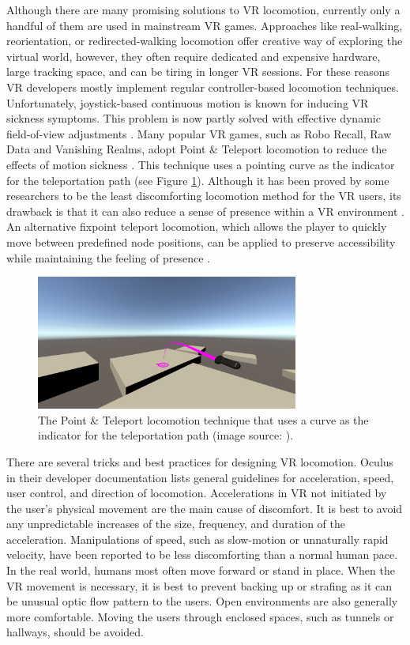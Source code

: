 Although there are many promising solutions to VR locomotion, currently only a handful of them are used in mainstream VR games. Approaches like real-walking, reorientation, or redirected-walking locomotion offer creative way of exploring the virtual world, however, they often require dedicated and expensive hardware, large tracking space, and can be tiring in longer VR sessions. For these reasons VR developers mostly implement regular controller-based locomotion techniques. Unfortunately, joystick-based continuous motion is known for inducing VR sickness symptoms. This problem is now partly solved with effective dynamic field-of-view adjustments \cite{DYNAMICFOD}. Many popular VR games, such as Robo Recall, Raw Data and Vanishing Realms, adopt Point \& Teleport locomotion to reduce the effects of motion sickness \cite{TELEPORTATIONGAMES}. This technique uses a pointing curve as the indicator for the teleportation path (see Figure \ref{fig:TELEPORTATIONCURVEIMAGE}). Although it has been proved by some researchers to be the least discomforting locomotion method for the VR users, its drawback is that it can also reduce a sense of presence within a VR environment \cite{TELEPORTATIONEFFECTS}. An alternative fixpoint teleport locomotion, which allows the player to quickly move between predefined node positions, can be applied to preserve accessibility while maintaining the feeling of presence \cite{NODEBASEDTELEPORTATION}.

\begin{figure}[th]
\centering
\includegraphics[width=0.77\textwidth]{img/teleportation_curve.png}
\caption{The Point \& Teleport locomotion technique that uses a curve as the indicator for the teleportation path (image source: \cite{TELEPORTATIONCURVE}).}
\label{fig:TELEPORTATIONCURVEIMAGE}
\end{figure}

There are several tricks and best practices for designing VR locomotion. Oculus in their developer documentation \cite{OCULUSDOC} lists general guidelines for acceleration, speed, user control, and direction of locomotion. Accelerations in VR not initiated by the user's physical movement are the main cause of discomfort. It is best to avoid any unpredictable increases of the size, frequency, and duration of the acceleration. Manipulations of speed, such as slow-motion or unnaturally rapid velocity, have been reported to be less discomforting than a normal human pace. In the real world, humans most often move forward or stand in place. When the VR movement is necessary, it is best to prevent backing up or strafing as it can be unusual optic flow pattern to the users. Open environments are also generally more comfortable. Moving the users through enclosed spaces, such as tunnels or hallways, should be avoided.

